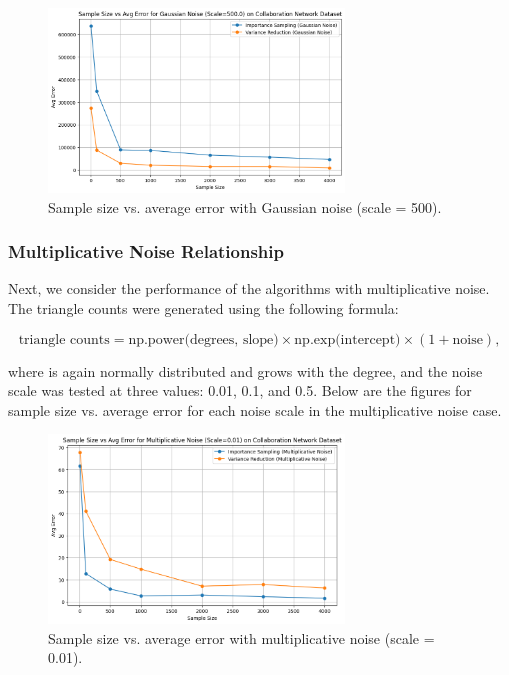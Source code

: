 \documentclass[11pt]{article}
\begin{document}
\begin{figure}[H]
    \centering
    \includegraphics[width=0.7\textwidth]{plots/simulated/percent_error_vs_sample_size_comparison_gaussian_500.0.png}
    \caption{Sample size vs. average error with Gaussian noise (scale = 500).}
    \label{fig:gaussian_noise_500}
\end{figure}

\subsubsection{Multiplicative Noise Relationship}

Next, we consider the performance of the algorithms with multiplicative noise. The triangle counts were generated using the following formula:

\[
\text{triangle counts} = \text{np.power(degrees, slope)} \times \text{np.exp(intercept)} \times (1 + \text{noise}),
\]

where  is again normally distributed and grows with the degree, and the noise scale was tested at three values: 0.01, 0.1, and 0.5. Below are the figures for sample size vs. average error for each noise scale in the multiplicative noise case.

\begin{figure}[H]
    \centering
    \includegraphics[width=0.7\textwidth]{plots/simulated/percent_error_vs_sample_size_comparison_multiplicative_0.01.png}
    \caption{Sample size vs. average error with multiplicative noise (scale = 0.01).}
    \label{fig:multiplicative_noise_001}
\end{figure}
\end{document}
